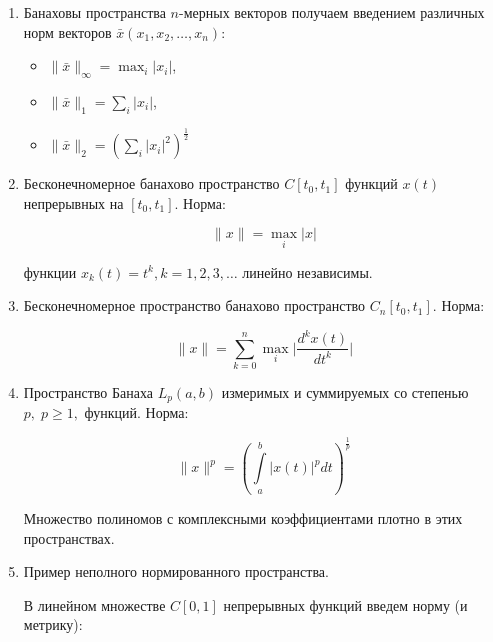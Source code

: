 \documentclass[12pt,a4paper,titlepage, oneside]{book}
\theoremstyle{definition}
\theoremstyle{plain}
\theoremstyle{remark}
\theoremstyle{remark}
\theoremstyle{remark}
\theoremstyle{plain}
\theoremstyle{plain}
\begin{document}
\begin{enumerate}

	\item Банаховы пространства $n$-мерных векторов получаем введением различных норм векторов $\bar{x}(x_1,x_2,\ldots,x_n)$:

	\begin{itemize}

		\item $\lVert \bar{x}\rVert_\infty=\displaystyle\max_{i}\lvert x_i\rvert$,

		\item $\lVert \bar{x}\rVert_1 = \displaystyle\sum_{i}\lvert x_i\rvert$,

		\item $\lVert \bar{x}\rVert_2 = (\displaystyle\sum_{i}\lvert x_i\rvert^2)^{\frac{1}{2}}$

	\end{itemize}

	\item Бесконечномерное банахово пространство $C[t_0,t_1]$ функций $x(t)$ непрерывных на $[t_0,t_1]$. Норма:

	\begin{equation*}
	\lVert x\rVert = \displaystyle\max_{i}\lvert x\rvert
	\end{equation*}

	функции $x_k(t)=t^k, k=1,2,3,\ldots$ линейно независимы.

	\item Бесконечномерное пространство банахово пространство $C_n[t_0,t_1]$. Норма:

	\begin{equation*}
	\lVert x\rVert = \displaystyle\sum_{k=0}^n\max_{i}\lvert\frac{d^kx(t)}{dt^k}\rvert
	\end{equation*}

	\item Пространство Банаха $L_p(a,b)$ измеримых и суммируемых со степенью $p,\;p\geq1,$ функций. Норма:

	\begin{equation*}
	\lVert x\rVert^p = (\int\limits_a^b\lvert x(t)\rvert^pdt)^{\frac{1}{p}}
	\end{equation*}

	Множество полиномов с комплексными коэффициентами плотно в этих пространствах.

	\item Пример неполного нормированного пространства.

	В линейном множестве $C[0,1]$ непрерывных функций введем норму (и метрику):


\end{enumerate}
\end{document}
